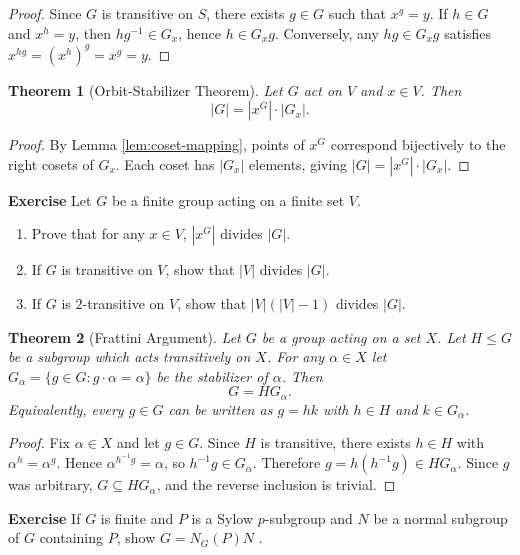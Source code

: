 \documentclass[12pt,a4paper,openany]{book}
\newtheorem{theorem}{Theorem}[section]
\begin{document}
\begin{proof}
Since $G$ is transitive on $S$, there exists $g \in G$ such that $x^g = y$. If $h \in G$ and $x^h = y$, then $hg^{-1} \in G_x$, hence $h \in G_x g$. Conversely, any $hg \in G_x g$ satisfies $x^{hg} = (x^h)^g = x^g = y$.
\end{proof}

\begin{theorem}[Orbit-Stabilizer Theorem]\label{thm:orbit-stabilizer}
Let $G$ act on $V$ and $x \in V$. Then
\[
|G| = |x^G| \cdot |G_x|.
\]
\end{theorem}

\begin{proof}
By Lemma \ref{lem:coset-mapping}, points of $x^G$ correspond bijectively to the right cosets of $G_x$. Each coset has $|G_x|$ elements, giving $|G| = |x^G| \cdot |G_x|$.
\end{proof}

\bigskip\noindent\textbf{Exercise}
Let $G$ be a finite group acting on a finite set $V$.
\begin{enumerate}
\item Prove that for any $x \in V$, $|x^G|$ divides $|G|$.
\item If $G$ is transitive on $V$, show that $|V|$ divides $|G|$.
\item If $G$ is $2$-transitive on $V$, show that $|V|(|V|-1)$ divides $|G|$.
\end{enumerate}




\begin{theorem}[Frattini Argument]\label{thm:frattini}
Let $G$ be a group acting on a set $X$. Let $H \le G$ be a subgroup which acts transitively on $X$. For any $\alpha \in X$ let $G_\alpha = \{ g \in G : g \cdot \alpha = \alpha \}$ be the stabilizer of $\alpha$. Then
\[
G = H G_\alpha.
\]
Equivalently, every $g \in G$ can be written as $g = hk$ with $h \in H$ and $k \in G_\alpha$.
\end{theorem}

\begin{proof}
Fix $\alpha \in X$ and let $g \in G$. Since $H$ is transitive, there exists $h \in H$ with $\alpha^h = \alpha^g$. Hence $\alpha^{h^{-1}g} = \alpha$, so $h^{-1}g \in G_\alpha$. Therefore $g = h(h^{-1}g) \in H G_\alpha$. Since $g$ was arbitrary, $G \subseteq H G_\alpha$, and the reverse inclusion is trivial.
\end{proof}

\bigskip\noindent\textbf{Exercise}
 If $G$ is finite and $P$ is a Sylow $p$-subgroup and $N$ be a normal subgroup of $G$ containing $P$, show $G = N_G(P) N$ .
\end{document}
